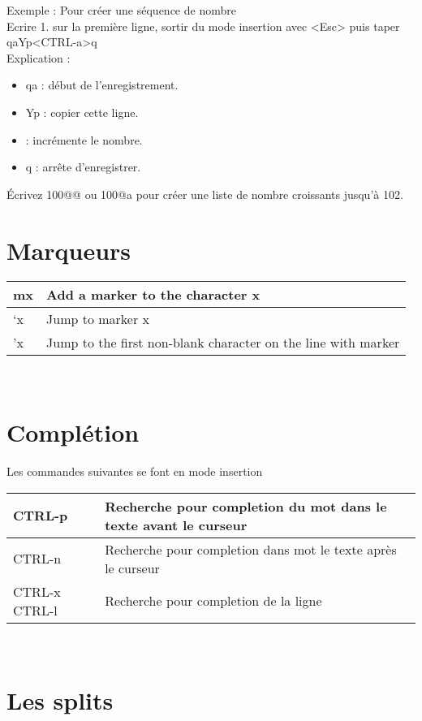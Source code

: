 \documentclass{article}
\begin{document}
\noindent
Exemple : Pour créer une séquence de nombre\\
\noindent
Ecrire 1. sur la première ligne, sortir du mode insertion avec <Esc> puis taper qaYp<CTRL-a>q\\
Explication :
\begin{itemize}
\renewcommand{\labelitemi}{$\bullet$}
\item qa : début de l'enregistrement.
\item Yp : copier cette ligne.
\item <CTRL-a> : incrémente le nombre.
\item q : arrête d'enregistrer.
    \end{itemize}
    Écrivez 100@@ ou 100@a pour créer une liste de nombre croissants jusqu'à 102.
\section{Marqueurs}
\begin{tabular}{|p{3cm}| l| }
\hline
mx & Add a marker to the character x\\ \hline
`x & Jump to marker x\\ \hline
'x & Jump to the first non-blank character on the line with marker\\ \hline
\end{tabular}\\

\section{Complétion}
Les commandes suivantes se font en mode insertion\\


\begin{tabular}{|p{3cm}| l| }
    \hline
CTRL-p & Recherche pour completion du mot dans le texte avant le curseur \\ \hline
CTRL-n & Recherche pour completion dans mot le texte après le curseur \\ \hline
CTRL-x CTRL-l &	Recherche pour completion de la ligne \\ \hline
\end{tabular}\\


\section{Les splits}
\end{document}

